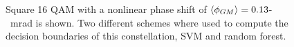 \begin{figure}[H]
  \centering
  \qquad
  \caption{Square 16 QAM with a nonlinear phase shift of $\braket{\phi_{GM}}= 0.13$-~mrad is shown. Two different schemes where used to compute the decision boundaries of this constellation, SVM and random forest.}                                                                                                                                                                                                                                                                                                                                                                                                                                                                                                                                                                                                                                                                                                                                                                                                                                                                                                                                                                                                                                                                                                                                                                                                                                                                                                                                                                                                                                                                                                                                                                                                                                                                                                                                                                                                                                                                                                                                                                                                                                                                                                                                                                                                                                                                                                                                                                                                                                                                                                                                                                                                                                                                                                                                                                                                                                                                                                                                    
\end{figure}
